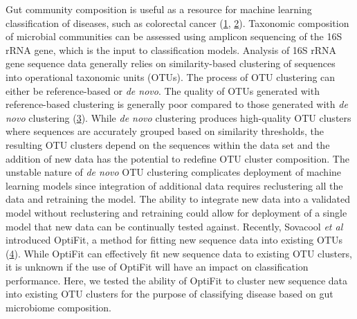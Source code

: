 \documentclass[
]{article}
\begin{document}
\newpage

Gut community composition is useful as a resource for machine learning
classification of diseases, such as colorectal cancer
(\protect\hyperlink{ref-baxter2016}{1},
\protect\hyperlink{ref-zackular2014}{2}). Taxonomic composition of
microbial communities can be assessed using amplicon sequencing of the
16S rRNA gene, which is the input to classification models. Analysis of
16S rRNA gene sequence data generally relies on similarity-based
clustering of sequences into operational taxonomic units (OTUs). The
process of OTU clustering can either be reference-based or \emph{de
novo}. The quality of OTUs generated with reference-based clustering is
generally poor compared to those generated with \emph{de novo}
clustering (\protect\hyperlink{ref-westcott2015}{3}). While \emph{de
novo} clustering produces high-quality OTU clusters where sequences are
accurately grouped based on similarity thresholds, the resulting OTU
clusters depend on the sequences within the data set and the addition of
new data has the potential to redefine OTU cluster composition. The
unstable nature of \emph{de novo} OTU clustering complicates deployment
of machine learning models since integration of additional data requires
reclustering all the data and retraining the model. The ability to
integrate new data into a validated model without reclustering and
retraining could allow for deployment of a single model that new data
can be continually tested against. Recently, Sovacool \emph{et al}
introduced OptiFit, a method for fitting new sequence data into existing
OTUs (\protect\hyperlink{ref-sovacool2022}{4}). While OptiFit can
effectively fit new sequence data to existing OTU clusters, it is
unknown if the use of OptiFit will have an impact on classification
performance. Here, we tested the ability of OptiFit to cluster new
sequence data into existing OTU clusters for the purpose of classifying
disease based on gut microbiome composition.
\end{document}
